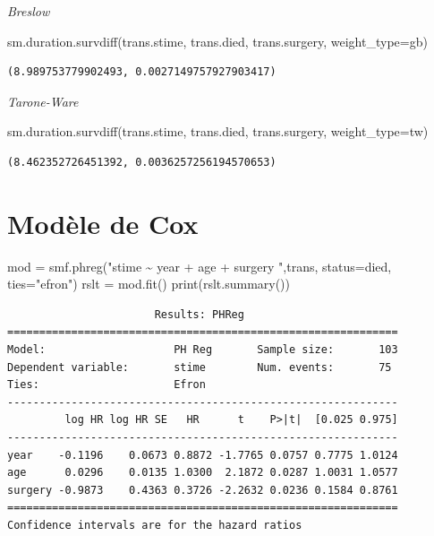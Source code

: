 \documentclass[
  12pt,
  letterpaper,
  DIV=11,
  numbers=noendperiod,
  onepage,
  openany]{scrreprt}
\newenvironment{Shaded}{\begin{snugshade}}{\end{snugshade}}
\newcommand{\BuiltInTok}[1]{\textcolor[rgb]{0.80,0.80,0.80}{#1}}
\newcommand{\NormalTok}[1]{\textcolor[rgb]{0.80,0.80,0.80}{#1}}
\newcommand{\OperatorTok}[1]{\textcolor[rgb]{0.94,0.94,0.82}{#1}}
\newcommand{\StringTok}[1]{\textcolor[rgb]{0.80,0.58,0.58}{#1}}
\begin{document}
\emph{Breslow}

\begin{Shaded}
\begin{Highlighting}[]
\NormalTok{sm.duration.survdiff(trans.stime, trans.died, trans.surgery, weight\_type}\OperatorTok{=}\StringTok{\textquotesingle{}gb\textquotesingle{}}\NormalTok{)}
\end{Highlighting}
\end{Shaded}

\begin{verbatim}
(8.989753779902493, 0.0027149757927903417)
\end{verbatim}

\emph{Tarone-Ware}

\begin{Shaded}
\begin{Highlighting}[]
\NormalTok{sm.duration.survdiff(trans.stime, trans.died, trans.surgery, weight\_type}\OperatorTok{=}\StringTok{\textquotesingle{}tw\textquotesingle{}}\NormalTok{)}
\end{Highlighting}
\end{Shaded}

\begin{verbatim}
(8.462352726451392, 0.0036257256194570653)
\end{verbatim}

\hypertarget{moduxe8le-de-cox-4}{%
\section{Modèle de Cox}\label{moduxe8le-de-cox-4}}

\begin{Shaded}
\begin{Highlighting}[]
\NormalTok{mod }\OperatorTok{=}\NormalTok{ smf.phreg(}\StringTok{"stime \textasciitilde{}  year + age + surgery "}\NormalTok{,trans, status}\OperatorTok{=}\StringTok{\textquotesingle{}died\textquotesingle{}}\NormalTok{, ties}\OperatorTok{=}\StringTok{"efron"}\NormalTok{)}
\NormalTok{rslt }\OperatorTok{=}\NormalTok{ mod.fit()}
\BuiltInTok{print}\NormalTok{(rslt.summary())}
\end{Highlighting}
\end{Shaded}

\begin{verbatim}
                       Results: PHReg
=============================================================
Model:                    PH Reg       Sample size:       103
Dependent variable:       stime        Num. events:       75 
Ties:                     Efron                              
-------------------------------------------------------------
         log HR log HR SE   HR      t    P>|t|  [0.025 0.975]
-------------------------------------------------------------
year    -0.1196    0.0673 0.8872 -1.7765 0.0757 0.7775 1.0124
age      0.0296    0.0135 1.0300  2.1872 0.0287 1.0031 1.0577
surgery -0.9873    0.4363 0.3726 -2.2632 0.0236 0.1584 0.8761
=============================================================
Confidence intervals are for the hazard ratios
\end{verbatim}
\end{document}
